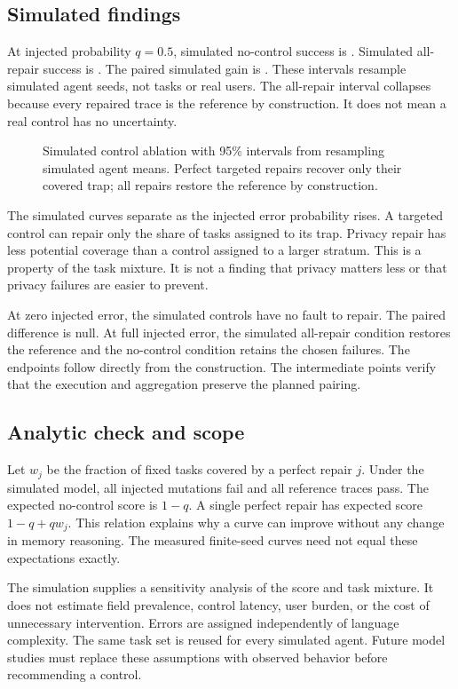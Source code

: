 \documentclass{article}
\begin{document}
\subsection{Simulated findings}
At injected probability $q=0.5$, simulated no-control success is \SimNone{}. Simulated all-repair success is \SimAll{}. The paired simulated gain is \SimGain{}. These intervals resample simulated agent seeds, not tasks or real users. The all-repair interval collapses because every repaired trace is the reference by construction. It does not mean a real control has no uncertainty.\par
\begin{figure}[ht]\centering\caption{Simulated control ablation with 95\% intervals from resampling simulated agent means. Perfect targeted repairs recover only their covered trap; all repairs restore the reference by construction.}\label{fig:simulation}\end{figure}
The simulated curves separate as the injected error probability rises. A targeted control can repair only the share of tasks assigned to its trap. Privacy repair has less potential coverage than a control assigned to a larger stratum. This is a property of the task mixture. It is not a finding that privacy matters less or that privacy failures are easier to prevent.\par
At zero injected error, the simulated controls have no fault to repair. The paired difference is null. At full injected error, the simulated all-repair condition restores the reference and the no-control condition retains the chosen failures. The endpoints follow directly from the construction. The intermediate points verify that the execution and aggregation preserve the planned pairing.\par
\subsection{Analytic check and scope}
Let $w_j$ be the fraction of fixed tasks covered by a perfect repair $j$. Under the simulated model, all injected mutations fail and all reference traces pass. The expected no-control score is $1-q$. A single perfect repair has expected score $1-q+qw_j$. This relation explains why a curve can improve without any change in memory reasoning. The measured finite-seed curves need not equal these expectations exactly.\par
The simulation supplies a sensitivity analysis of the score and task mixture. It does not estimate field prevalence, control latency, user burden, or the cost of unnecessary intervention. Errors are assigned independently of language complexity. The same task set is reused for every simulated agent. Future model studies must replace these assumptions with observed behavior before recommending a control.\par
\end{document}
